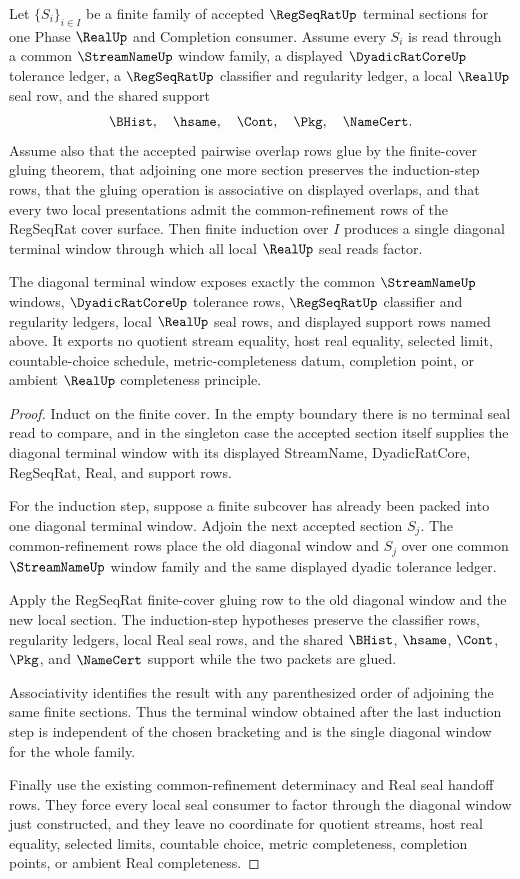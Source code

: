 \begin{theorem}
\label{thm:regseqrat-finite-cover-induction-diagonal}
Let $\{S_i\}_{i \in I}$ be a finite family of accepted $\RegSeqRatUp$ terminal sections for one Phase $\RealUp$ and Completion consumer. Assume every $S_i$ is read through a common $\StreamNameUp$ window family, a displayed $\DyadicRatCoreUp$ tolerance ledger, a $\RegSeqRatUp$ classifier and regularity ledger, a local $\RealUp$ seal row, and the shared support
$$
\BHist,\quad \hsame,\quad \Cont,\quad \Pkg,\quad \NameCert.
$$
Assume also that the accepted pairwise overlap rows glue by the finite-cover gluing theorem, that adjoining one more section preserves the induction-step rows, that the gluing operation is associative on displayed overlaps, and that every two local presentations admit the common-refinement rows of the RegSeqRat cover surface. Then finite induction over $I$ produces a single diagonal terminal window through which all local $\RealUp$ seal reads factor.

The diagonal terminal window exposes exactly the common $\StreamNameUp$ windows, $\DyadicRatCoreUp$ tolerance rows, $\RegSeqRatUp$ classifier and regularity ledgers, local $\RealUp$ seal rows, and displayed support rows named above. It exports no quotient stream equality, host real equality, selected limit, countable-choice schedule, metric-completeness datum, completion point, or ambient $\RealUp$ completeness principle.
\end{theorem}
\begin{proof}
Induct on the finite cover. In the empty boundary there is no terminal seal read to compare, and in the singleton case the accepted section itself supplies the diagonal terminal window with its displayed StreamName, DyadicRatCore, RegSeqRat, Real, and support rows.

For the induction step, suppose a finite subcover has already been packed into one diagonal terminal window. Adjoin the next accepted section $S_j$. The common-refinement rows place the old diagonal window and $S_j$ over one common $\StreamNameUp$ window family and the same displayed dyadic tolerance ledger.

Apply the RegSeqRat finite-cover gluing row to the old diagonal window and the new local section. The induction-step hypotheses preserve the classifier rows, regularity ledgers, local Real seal rows, and the shared $\BHist$, $\hsame$, $\Cont$, $\Pkg$, and $\NameCert$ support while the two packets are glued.

Associativity identifies the result with any parenthesized order of adjoining the same finite sections. Thus the terminal window obtained after the last induction step is independent of the chosen bracketing and is the single diagonal window for the whole family.

Finally use the existing common-refinement determinacy and Real seal handoff rows. They force every local seal consumer to factor through the diagonal window just constructed, and they leave no coordinate for quotient streams, host real equality, selected limits, countable choice, metric completeness, completion points, or ambient Real completeness.
\end{proof}

